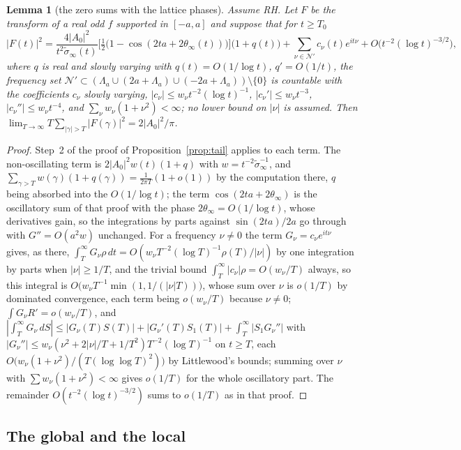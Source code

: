 \documentclass[11pt]{article}
\newtheorem{lemma}[theorem]{Lemma}
\theoremstyle{definition}
\theoremstyle{remark}
\begin{document}
\begin{lemma}[the zero sums with the lattice phases]\label{lem:tailecho}
Assume RH. Let $F$ be the transform of a real odd $f$ supported in $[-a,a]$ and suppose that for $t\ge T_0$
\[
|F(t)|^2=\frac{4|A_0|^2}{t^2\tilde\sigma_\infty(t)}\Big[\tfrac12\big(1-\cos(2ta+2\theta_\infty(t))\big)\Big]\big(1+q(t)\big)+\sum_{\nu\in\mathcal N'}c_\nu(t)e^{it\nu}+O\big(t^{-2}(\log t)^{-3/2}\big),
\]
where $q$ is real and slowly varying with $q(t)=O(1/\log t)$, $q'=O(1/t)$, the frequency set $\mathcal N'\subset(\Lambda_a\cup(2a+\Lambda_a)\cup(-2a+\Lambda_a))\setminus\{0\}$ is countable with the coefficients $c_\nu$ slowly varying, $|c_\nu|\le w_\nu t^{-2}(\log t)^{-1}$, $|c_\nu'|\le w_\nu t^{-3}$, $|c_\nu''|\le w_\nu t^{-4}$, and $\sum_\nu w_\nu(1+\nu^2)<\infty$; no lower bound on $|\nu|$ is assumed. Then $\lim_{T\to\infty}T\sum_{|\gamma|>T}|F(\gamma)|^2=2|A_0|^2/\pi$.
\end{lemma}
\begin{proof}
Step~2 of the proof of Proposition~\ref{prop:tail} applies to each term. The non-oscillating term is $2|A_0|^2w(t)(1+q)$ with $w=t^{-2}\tilde\sigma_\infty^{-1}$, and $\sum_{\gamma>T}w(\gamma)(1+q(\gamma))=\frac1{2\pi T}(1+o(1))$ by the computation there, $q$ being absorbed into the $O(1/\log t)$; the term $\cos(2ta+2\theta_\infty)$ is the oscillatory sum of that proof with the phase $2\theta_\infty=O(1/\log t)$, whose derivatives gain, so the integrations by parts against $\sin(2ta)/2a$ go through with $G''=O(a^2w)$ unchanged. For a frequency $\nu\ne0$ the term $G_\nu=c_\nu e^{it\nu}$ gives, as there, $\int_T^\infty G_\nu\rho\,dt=O(w_\nu T^{-2}(\log T)^{-1}\rho(T)/|\nu|)$ by one integration by parts when $|\nu|\ge1/T$, and the trivial bound $\int_T^\infty|c_\nu|\rho=O(w_\nu/T)$ always, so this integral is $O\big(w_\nu T^{-1}\min(1,1/(|\nu|T))\big)$, whose sum over $\nu$ is $o(1/T)$ by dominated convergence, each term being $o(w_\nu/T)$ because $\nu\ne0$; $\int G_\nu R'=o(w_\nu/T)$, and $|\int_T^\infty G_\nu\,dS|\le|G_\nu(T)S(T)|+|G_\nu'(T)S_1(T)|+\int_T^\infty|S_1G_\nu''|$ with $|G_\nu''|\le w_\nu(\nu^2+2|\nu|/T+1/T^2)T^{-2}(\log T)^{-1}$ on $t\ge T$, each $O\big(w_\nu(1+\nu^2)/(T(\log\log T)^2)\big)$ by Littlewood's bounds; summing over $\nu$ with $\sum w_\nu(1+\nu^2)<\infty$ gives $o(1/T)$ for the whole oscillatory part. The remainder $O(t^{-2}(\log t)^{-3/2})$ sums to $o(1/T)$ as in that proof.
\end{proof}


\subsection{The global and the local}\label{sec:globallocal}
\end{document}
